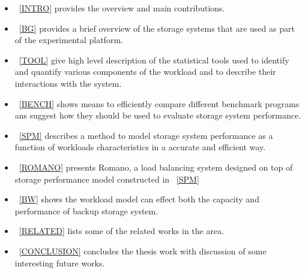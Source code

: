 \begin{itemize}

\item \CHP~\ref{INTRO} provides the overview and main contributions.

\item \CHP~\ref{BG} provides a brief overview of the storage systems that are used as part of the experimental platform.

\item \CHP~\ref{TOOL} give high level description of the statistical tools used to identify and quantify various components of the workload and to describe their interactions with the system. 

\item \CHP~\ref{BENCH} shows means to efficiently compare different benchmark programs ans suggest how they should be used to evaluate storage system performance. 

\item \CHP~\ref{SPM} describes a method to model storage system performance as a function of workloads characteristics in a accurate and efficient way.

\item \CHP~\ref{ROMANO} presents Romano, a load balancing system designed on top of storage performance model constructed in \CHP~\ref{SPM}

\item \CHP~\ref{BW} shows the workload model can effect both the capacity and performance of backup storage system. 

\item \CHP~\ref{RELATED} lists some of the related works in the area.

\item \CHP~\ref{CONCLUSION} concludes the thesis work with discussion of some interesting future works. 
 
\end{itemize}
